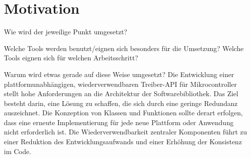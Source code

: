 \section{Motivation}
 
Wie wird der jeweilige Punkt umgesetzt?

Welche Tools werden benutzt/eignen sich besonders für die Umsetzung?
Welche Tools eignen sich für welchen Arbeitsschritt?

Warum wird etwas gerade auf diese Weise umgesetzt?
\newline
\newline
Die Entwicklung einer plattformunabhängigen, wiederverwendbaren Treiber-API für Mikrocontroller stellt hohe Anforderungen an die Architektur der Softwarebibliothek.
Das Ziel besteht darin, eine Lösung zu schaffen, die sich durch eine geringe Redundanz auszeichnet. 
Die Konzeption von Klassen und Funktionen sollte derart erfolgen, dass eine erneute Implementierung für jede neue Plattform oder Anwendung nicht erforderlich ist.
Die Wiederverwendbarkeit zentraler Komponenten führt zu einer Reduktion des Entwicklungsaufwands und einer Erhöhung der Konsistenz im Code.

